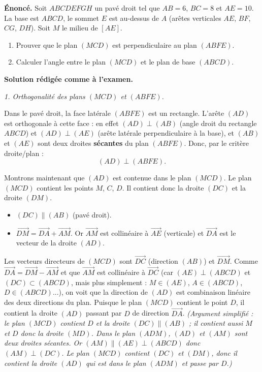 \documentclass[11pt]{article}
\begin{document}
\begin{exoresolu}
\textbf{Énoncé.} Soit $ABCDEFGH$ un pavé droit tel que $AB=6$, $BC=8$ et $AE=10$. La base est $ABCD$, le sommet $E$ est au-dessus de $A$ (arêtes verticales $AE$, $BF$, $CG$, $DH$). Soit $M$ le milieu de $[AE]$.
\begin{enumerate}
\item Prouver que le plan $(MCD)$ est perpendiculaire au plan $(ABFE)$.
\item Calculer l'angle entre le plan $(MCD)$ et le plan de base $(ABCD)$.
\end{enumerate}
\tcblower
\textbf{Solution rédigée comme à l'examen.}

\emph{1. Orthogonalité des plans $(MCD)$ et $(ABFE)$.}

Dans le pavé droit, la face latérale $(ABFE)$ est un rectangle. L'arête $(AD)$ est orthogonale à cette face : en effet $(AD)\perp(AB)$ (angle droit du rectangle $ABCD$) et $(AD)\perp(AE)$ (arête latérale perpendiculaire à la base), et $(AB)$ et $(AE)$ sont deux droites \textbf{sécantes} du plan $(ABFE)$. Donc, par le critère droite/plan :
\[ (AD)\perp(ABFE). \]

Montrons maintenant que $(AD)$ est contenue dans le plan $(MCD)$.
Le plan $(MCD)$ contient les points $M$, $C$, $D$. Il contient donc la droite $(DC)$ et la droite $(DM)$.
\begin{itemize}
\item $(DC)\parallel(AB)$ (pavé droit).
\item $\overrightarrow{DM} = \overrightarrow{DA} + \overrightarrow{AM}$. Or $\overrightarrow{AM}$ est collinéaire à $\overrightarrow{AE}$ (verticale) et $\overrightarrow{DA}$ est le vecteur de la droite $(AD)$.
\end{itemize}
Les vecteurs directeurs de $(MCD)$ sont $\overrightarrow{DC}$ (direction $(AB)$) et $\overrightarrow{DM}$. Comme $\overrightarrow{DA} = \overrightarrow{DM} - \overrightarrow{AM}$ et que $\overrightarrow{AM}$ est collinéaire à $\overrightarrow{DC}$ (car $(AE)\perp(ABCD)$ et $(DC)\subset(ABCD)$, mais plus simplement : $M\in(AE)$, $A\in(ABCD)$, $D\in(ABCD)$...), on voit que la direction de $(AD)$ est combinaison linéaire des deux directions du plan. Puisque le plan $(MCD)$ contient le point $D$, il contient la droite $(AD)$ passant par $D$ de direction $\overrightarrow{DA}$.
\emph{(Argument simplifié : le plan $(MCD)$ contient $D$ et la droite $(DC)\parallel(AB)$ ; il contient aussi $M$ et $D$ donc la droite $(MD)$. Dans le plan $(ADM)$, $(AD)$ et $(AM)$ sont deux droites sécantes. Or $(AM)\parallel(AE)\perp(ABCD)$ donc $(AM)\perp(DC)$. Le plan $(MCD)$ contient $(DC)$ et $(DM)$, donc il contient la droite $(AD)$ qui est dans le plan $(ADM)$ et passe par $D$.)}


\end{exoresolu}
\end{document}
